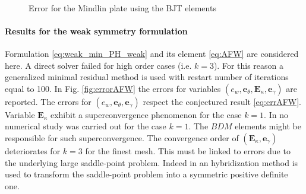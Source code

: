 \begin{figure}[t]%
	\centering
	\hspace{8pt}%
	 \\
	\hspace{8pt}%
	\caption[errorBEC]{Error for the Mindlin plate using the BJT elements}%
	\label{fig:errorBEC}%
\end{figure}

\paragraph{Results for the weak symmetry formulation} 
Formulation \eqref{eq:weak_min_PH_weak} and its element \eqref{eq:AFW} are considered here. A direct solver failed for high order cases (i.e. $k=3$). For this reason a generalized minimal residual method is used with restart number of iterations equal to 100. In Fig. \ref{fig:errorAFW} the errors for variables $(e_w, \bm{e}_\theta, \bm{E}_\kappa, \bm{e}_\gamma)$  are reported. The errors for $(e_w, \bm{e}_\theta, \bm{e}_\gamma)$ respect the conjectured result \eqref{eq:errAFW}. Variable $\bm{E}_\kappa$ exhibit a superconvergence phenomenon for the case $k=1$. In \cite{ArnoldWeak} no numerical study was carried out for the case $k=1$. The $BDM$ elements might be responsible for such superconvergence. The convergence order of $(\bm{E}_\kappa, \bm{e}_\gamma)$ deteriorates for $k=3$ for the finest mesh. This must be linked to errors due to the underlying large saddle-point problem. Indeed in \cite{ArnoldWeak} an hybridization method is used to transform the saddle-point problem into a symmetric positive definite one.


